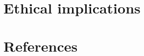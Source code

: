 \documentclass[
  letterpaper,
  DIV=11,
  numbers=noendperiod]{scrreprt}
\newlength{\cslhangindent}
\newlength{\cslentryspacingunit} %
\newenvironment{CSLReferences}[2] %
 {%
  \setlength{\parindent}{0pt}
  \ifodd #1
  \let\oldpar\par
  \def\par{\hangindent=\cslhangindent\oldpar}
  \fi
  \setlength{\parskip}{#2\cslentryspacingunit}
 }%
 {}
\begin{document}
\hypertarget{ethical-implications}{%
\chapter{Ethical implications}\label{ethical-implications}}


\hypertarget{references}{%
\chapter*{References}\label{references}}


\hypertarget{refs}{}
\begin{CSLReferences}{0}{0}
\end{CSLReferences}
\end{document}
